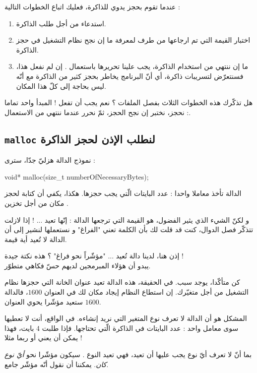 عندما تقوم بحجز يدوي للذاكرة، فعليك اتباع الخطوات التالية :
\begin{enumerate}
  \item استدعاء
من أجل طلب الذاكرة.
  \item اختبار القيمة التي تم ارجاعها من طرف
لمعرفة ما إن نجح نظام التشغيل في حجز الذاكرة.
  \item ما إن ننتهي من استخدام الذاكرة، يجب علينا تحريرها باستعمال
.
إن لم نفعل هذا، فسنتعرّض لتسريبات ذاكرة، أي أنّ البرنامج يخاطر بحجز كثير من الذاكرة مع أنّه ليس بحاجة إلى كلّ هذا المكان.
\end{enumerate}

هل تذكّرك هذه الخطوات الثلاث بفصل الملفات ؟ نعم يجب أن تفعل ! المبدأ واحد تماما : نحجز، نختبر إن نجح الحجز، ثمّ نحرر عندما ننتهي من الاستعمال.

\subsection{\texttt{malloc}
لنطلب الإذن لحجز الذاكرة}
نموذج الدالة
هزليّ جدّا، سترى :

\begin{Csource}
void* malloc(size_t numberOfNecessaryBytes);
\end{Csource}

الدالة تأخذ معاملا واحدا : عدد البايتات الّتي يجب حجزها. هكذا، يكفي أن كتابة
لحجز مكان من أجل تخزين
.

و لكنّ الشيء الذي يثير الفضول، هو القيمة التي ترجعها الدالة : إنّها تعيد ...
 !
إذا لازلت تتذكّر فصل الدوال، كنت قد قلت لك بأن الكلمة
تعني "الفراغ" و نستعملها لنشير إلى أن الدالة لا تُعيد أية قيمة.

إذن هنا، لدينا دالة تُعيد ... "مؤشّراً نحو فراغ" ؟ هذه نكتة جيدة !\\
يبدو أن هؤلاء المبرمجين لديهم حسّ فكاهي متطوّر.

كن متأكّدا، يوجد سبب. في الحقيقة، هذه الدالة تعيد عنوان الخانة التي حجزها نظام التشغيل من أجل متغيّرك. إن استطاع النظام إيجاد مكان لك في العنوان
$1600$،
فالدالة ستعيد مؤشّرا يحوي العنوان
$1600$.

المشكل هو أن الدالة
لا تعرف نوع المتغير التي نريد إنشاءه. في الواقع، أنت لا تعطيها سوى معامل واحد : عدد البايتات في الذاكرة الّتي تحتاجها. فإذا طلبت 4 بايت، فهذا يمكن أن يعني
أو ربما
مثلا !

بما أنّ
لا تعرف أيّ نوع يجب عليها أن تعيد، فهي تعيد النوع
.
سيكون مؤشّرا نحو
\textit{أيّ نوع كان}.
يمكننا أن نقول أنّه مؤشّر جامع.

